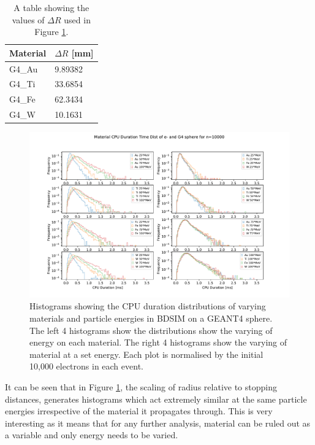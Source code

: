 \documentclass[12pt,a4paper]{article}
\begin{document}
\begin{table}[h!]
\centering
\begin{tabular}{|l|l|}
\hline
Material & $\Delta R$ [mm] \\ \hline
G4\_Au &  9.89382\\ \hline
G4\_Ti &  33.6854\\ \hline
G4\_Fe &  62.3434\\ \hline
G4\_W &  10.1631\\ \hline
\end{tabular}
\caption{A table showing the values of $\Delta R$ used in Figure \ref{var}.}
\label{rs}
\end{table}

\begin{figure}[h!]
\centering
\includegraphics[scale=0.6]{Images//Materials//Varied_by_radius_and_secondaries.pdf}
\caption[width=\columnwidth]{Histograms showing the CPU duration distributions of varying materials and particle energies in BDSIM on a GEANT4 sphere. The left 4 histograms show the distributions show the varying of energy on each material. The right 4 histograms show the varying of material at a set energy. Each plot is normalised by the initial 10,000 electrons in each event.}
\label{var}
\end{figure}

\noindent It can be seen that in Figure \ref{var}, the scaling of radius relative to stopping distances, generates histograms which act extremely similar at the same particle energies irrespective of the material it propagates through. This is very interesting as it means that for any further analysis, material can be ruled out as a variable and only energy needs to be varied.
\end{document}
